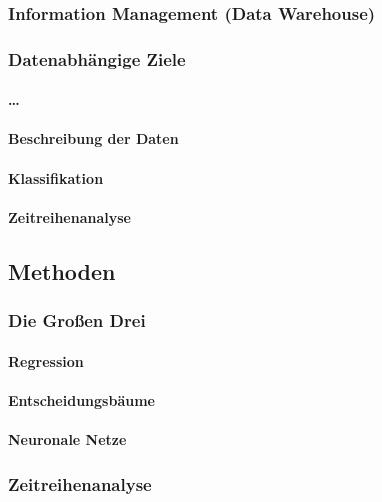 \documentclass[12pt,a4paper,listof=totoc,oneside]{scrreprt}
\begin{document}
\subsubsection{Information Management (Data Warehouse)}

\subsubsection{Datenabhängige Ziele}

\paragraph{\ldots}

\paragraph{Beschreibung der Daten}

\paragraph{Klassifikation}

\paragraph{Zeitreihenanalyse}

\subsection{Methoden}

\subsubsection{Die Großen Drei}

\paragraph{Regression}

\paragraph{Entscheidungsbäume}

\paragraph{Neuronale Netze}

\subsubsection{Zeitreihenanalyse}
\end{document}
